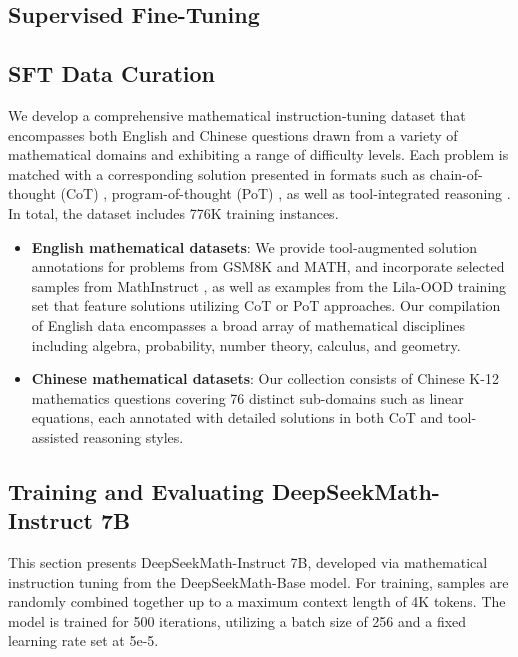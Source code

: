 \begin{itemize}[topsep=0pt]
\section{Supervised Fine-Tuning}

\subsection{SFT Data Curation}

We develop a comprehensive mathematical instruction-tuning dataset that encompasses both English and Chinese questions drawn from a variety of mathematical domains and exhibiting a range of difficulty levels. Each problem is matched with a corresponding solution presented in formats such as chain-of-thought (CoT) \citep{cot}, program-of-thought (PoT) \citep{pot,pal}, as well as tool-integrated reasoning \citep{tora}. In total, the dataset includes 776K training instances.

\begin{itemize}[topsep=0pt]
    \item \textbf{English mathematical datasets}: We provide tool-augmented solution annotations for problems from GSM8K and MATH, and incorporate selected samples from MathInstruct \citep{MathInstruct}, as well as examples from the Lila-OOD training set \citep{lila} that feature solutions utilizing CoT or PoT approaches. Our compilation of English data encompasses a broad array of mathematical disciplines including algebra, probability, number theory, calculus, and geometry.
    \item \textbf{Chinese mathematical datasets}: Our collection consists of Chinese K-12 mathematics questions covering 76 distinct sub-domains such as linear equations, each annotated with detailed solutions in both CoT and tool-assisted reasoning styles.
\end{itemize}

\subsection{Training and Evaluating DeepSeekMath-Instruct 7B}

This section presents DeepSeekMath-Instruct 7B, developed via mathematical instruction tuning from the DeepSeekMath-Base model. For training, samples are randomly combined together up to a maximum context length of 4K tokens. The model is trained for 500 iterations, utilizing a batch size of 256 and a fixed learning rate set at 5e-5.


\end{itemize}
